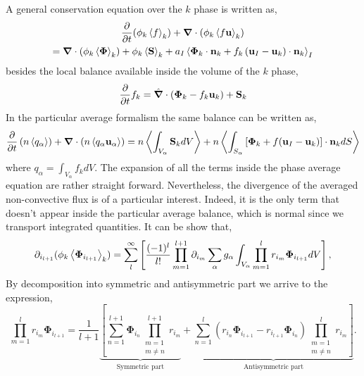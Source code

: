 A general conservation equation over the $k$ phase is written as, 
\begin{multline*}
    \frac{\partial}{\partial t} (\phi_k\left<f\right>_k)
    + \bm{\nabla} \cdot \left(
        \phi_k \left<f \textbf{u}\right>_k
    \right)\\
    = \bm{\nabla} \cdot \left(
        \phi_k \left<\bm{\Phi}\right>_k
    \right)
    + \phi_k \left<\textbf{S}\right>_k
    + a_I \left<
        \bm{\Phi}_k \cdot \textbf{n}_k
        + f_k 
        \left(
            \textbf{u}_I
            - \textbf{u}_k
        \right) \cdot \textbf{n}_k
    \right>_I 
\label{ap:eq:avg_k_global}
\end{multline*}
besides the local balance available inside the volume of the $k$ phase,
\begin{equation}
    \frac{\partial}{\partial t} f_k
    = \hat{\bm{\nabla}} \cdot \left(
        \bm{\Phi}_k
        - f_k\textbf{u}_k
        \right)
    + \textbf{S}_k
\end{equation}
In the particular average formalism the same balance can be written as, 
\begin{equation}
    \frac{\partial}{\partial t}   \left(n \left<q_\alpha\right>\right)
    + \bm{\nabla} \cdot \left(n \left<q_\alpha \textbf{u}_\alpha\right>\right)
    = n \left<\int_{V_\alpha} \textbf{S}_k dV \right>
    + n \left<\int_{S_\alpha} \left[\bm{\Phi}_k + f (\textbf{u}_I-\textbf{u}_k) \right] \cdot \textbf{n}_k d S\right>
\end{equation}
where $q_\alpha = \int_{V_\alpha} f_k dV$.
The expansion of all the terms inside the phase average equation are rather straight forward.
Nevertheless, the divergence of the averaged non-convective flux is of a particular interest. 
Indeed, it is the only term that doesn't appear inside the particular average balance, which is normal since we transport integrated quantities.
It can be show that, 
\begin{equation}
    \partial_{i_{l+1}}
    (\phi_k \left<\bm{\Phi}_{i_{l+1}}\right>_k)=
    \sum_l^\infty
    \left[
        \frac{(-1)^{l}}{l!}
        \prod^{l+1}_{m=1}
        \partial_{i_m}
        \sum_{\alpha}
        g_{\alpha}
        \int_{V_\alpha}
        \prod^{l}_{m=1}
        r_{i_m} \bm{\Phi}_{i_{l+1}}dV
    \right],
\end{equation}
By decomposition into symmetric and antisymmetric part we arrive to the expression, 
\begin{equation}
    \prod^{l}_{m=1} r_{i_m} \bm{\Phi}_{i_{l+1}}
    = \frac{1}{l+1}
    \underbrace{\left[
    \sum_{n=1}^{l+1} \bm{\Phi}_{i_{n}}\prod^{l+1}_{\substack{m=1 \\ m \neq n}} r_{i_m} \right.}_{\text{Symmetric part}}
    +\underbrace{\left.\sum_{n=1}^{l} (r_{i_n}\bm{\Phi}_{i_{l+1}} - r_{i_{l+1}}\bm{\Phi}_{i_{n}}) \prod^{l}_{\substack{m=1 \\ m \neq n}} r_{i_m} \right]}_{\text{Antisymmetric part}}.
\end{equation}

